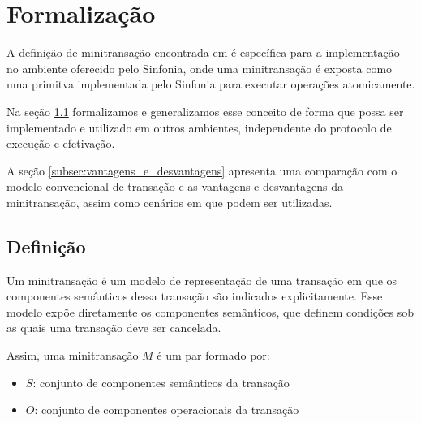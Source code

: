 \documentclass[11pt,twoside,a4paper]{book}
\begin{document}



\section{Formalização}
\label{sec:formalizacao}
A definição de minitransação encontrada em \cite{sinfonia} é específica para a implementação no ambiente oferecido pelo Sinfonia, onde uma minitransação é exposta como uma primitva implementada pelo Sinfonia para executar operações atomicamente.


Na seção \ref{subsec:definicao} formalizamos e generalizamos esse conceito de forma que possa ser implementado e utilizado em outros ambientes, independente do protocolo de execução e efetivação.

A seção \ref{subsec:vantagens_e_desvantagens} apresenta uma comparação com o modelo convencional de transação e as vantagens e desvantagens da minitransação, assim como cenários em que podem ser utilizadas.

\subsection{Definição}
\label{subsec:definicao}
Um minitransação é um modelo de representação de uma transação em que os componentes semânticos dessa transação são indicados explicitamente. Esse modelo expõe diretamente os componentes semânticos, que definem condições sob as quais uma transação deve ser cancelada.

Assim, uma minitransação $M$ é um par formado por:

\begin{itemize}
	\item $S$: conjunto de componentes semânticos da transação
	\item $O$: conjunto de componentes operacionais da transação
\end{itemize}
\end{document}
